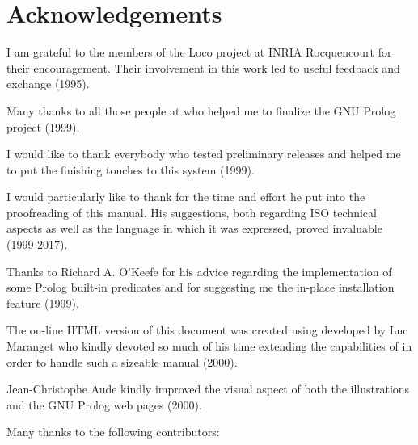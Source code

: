 \newpage
\section{Acknowledgements}

I am grateful to the members of the Loco project at
 {INRIA
  Rocquencourt} for their encouragement. Their involvement in this
work led to useful feedback and exchange (1995).

Many thanks to all those people at  who helped
me to finalize the GNU Prolog project (1999).

I would like to thank everybody who tested preliminary releases and
helped me to put the finishing touches to this system (1999).

I would particularly like to thank
 for the time and
effort he put into the proofreading of this manual. His suggestions, both
regarding ISO technical aspects as well as the language in which it was
expressed, proved invaluable (1999-2017).

Thanks to Richard A. O'Keefe for his advice regarding the implementation of
some Prolog built-in predicates and for suggesting me the in-place
installation feature (1999).

The on-line HTML version of this document was created using
 developed by
Luc Maranget who kindly devoted so much
of his time extending the capabilities of {\hevea} in order to handle such a
sizeable manual (2000).

Jean-Christophe Aude kindly improved the visual aspect of both the
illustrations and the GNU Prolog web pages (2000).


Many thanks to the following contributors:

